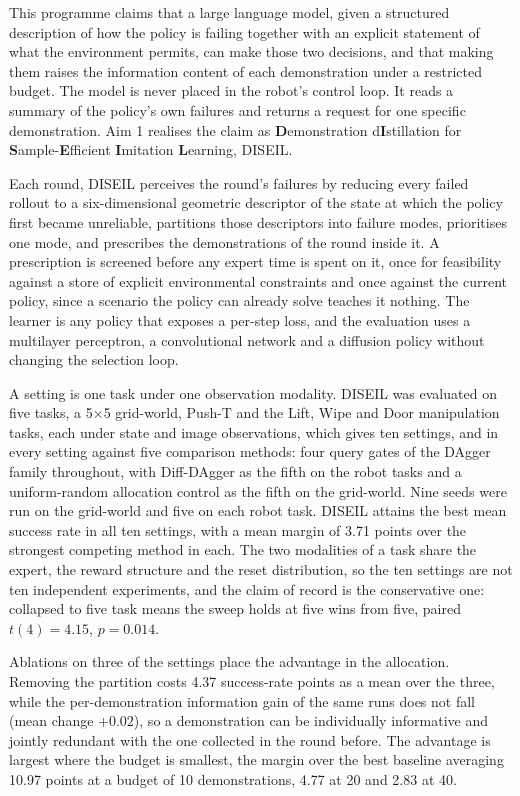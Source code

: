 \documentclass[
  11pt,
]{article}
\begin{document}
This programme claims that a large language model, given a structured
description of how the policy is failing together with an explicit
statement of what the environment permits, can make those two decisions,
and that making them raises the information content of each
demonstration under a restricted budget. The model is never placed in
the robot's control loop. It reads a summary of the policy's own
failures and returns a request for one specific demonstration. Aim 1
realises the claim as \textbf{D}emonstration d\textbf{I}stillation for
\textbf{S}ample-\textbf{E}fficient \textbf{I}mitation \textbf{L}earning,
DISEIL.

Each round, DISEIL perceives the round's failures by reducing every
failed rollout to a six-dimensional geometric descriptor of the state at
which the policy first became unreliable, partitions those descriptors
into failure modes, prioritises one mode, and prescribes the
demonstrations of the round inside it. A prescription is screened before
any expert time is spent on it, once for feasibility against a store of
explicit environmental constraints and once against the current policy,
since a scenario the policy can already solve teaches it nothing. The
learner is any policy that exposes a per-step loss, and the evaluation
uses a multilayer perceptron, a convolutional network and a diffusion
policy without changing the selection loop.

A setting is one task under one observation modality. DISEIL was
evaluated on five tasks, a 5×5 grid-world, Push-T and the Lift, Wipe and
Door manipulation tasks, each under state and image observations, which
gives ten settings, and in every setting against five comparison
methods: four query gates of the DAgger family throughout, with
Diff-DAgger as the fifth on the robot tasks and a uniform-random
allocation control as the fifth on the grid-world. Nine seeds were run
on the grid-world and five on each robot task. DISEIL attains the best
mean success rate in all ten settings, with a mean margin of 3.71 points
over the strongest competing method in each. The two modalities of a
task share the expert, the reward structure and the reset distribution,
so the ten settings are not ten independent experiments, and the claim
of record is the conservative one: collapsed to five task means the
sweep holds at five wins from five, paired \(t(4) = 4.15\),
\(p = 0.014\).

Ablations on three of the settings place the advantage in the
allocation. Removing the partition costs 4.37 success-rate points as a
mean over the three, while the per-demonstration information gain of the
same runs does not fall (mean change \(+0.02\)), so a demonstration can
be individually informative and jointly redundant with the one collected
in the round before. The advantage is largest where the budget is
smallest, the margin over the best baseline averaging 10.97 points at a
budget of 10 demonstrations, 4.77 at 20 and 2.83 at 40.
\end{document}
